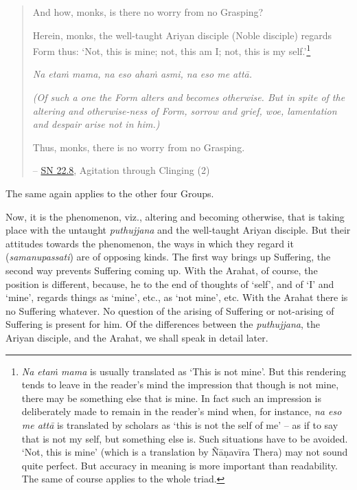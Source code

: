 \begin{quote}
And how, monks, is there no worry from no Grasping?

Herein, monks, the well-taught Ariyan disciple (Noble disciple) regards Form thus: `Not, this is mine; not, this am I; not, this is my self.'\footnote{\emph{Na etaṁ mama} is usually translated as `This is not mine'. But this rendering tends to leave in the reader's mind the impression that though  is not mine, there may be something else that is mine. In fact such an impression is deliberately made to remain in the reader's mind when, for instance, \emph{na eso me attā} is translated by scholars as `this is not the self of me' -- as if to say that  is not my self, but something else is. Such situations have to be avoided. `Not, this is mine' (which is a translation by Ñāṇavīra Thera) may not sound quite perfect. But accuracy in meaning is more important than readability. The same of course applies to the whole triad.}

\emph{Na etaṁ mama, na eso ahaṁ asmi, na eso me attā.}

\emph{(Of such a one the Form alters and becomes otherwise. But in spite of the altering and otherwise-ness of Form, sorrow and grief, woe, lamentation and despair arise not in him.)}

Thus, monks, there is no worry from no Grasping.

 -- \href{https://suttacentral.net/sn22.8/en/bodhi}{SN 22.8}, Agitation through Clinging (2)
\end{quote}

The same again applies to the other four Groups.

Now, it is the  phenomenon, viz., altering and becoming otherwise, that is taking place with the untaught \emph{puthujjana} and the well-taught Ariyan disciple. But their attitudes towards the phenomenon, the ways in which they regard it (\emph{samanupassati}) are of opposing kinds. The first way brings up Suffering, the second way prevents Suffering coming up. With the Arahat, of course, the position is different, because, he  to the end of  thoughts of `self', and of `I' and `mine',  regards things as `mine', etc.,  as `not mine', etc. With the Arahat there is no Suffering whatever. No question of the arising of Suffering or not-arising of Suffering is present for him. Of the differences between the \emph{puthujjana}, the Ariyan disciple, and the Arahat, we shall speak in detail later.

